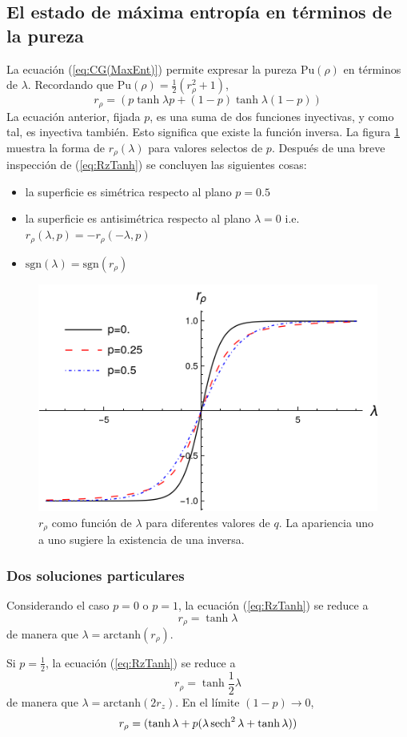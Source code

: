 \subsection{El estado de máxima entropía en términos de la pureza}

La ecuación (\ref{eq:CG(MaxEnt)}) permite expresar la pureza $\text{Pu}(\rho)$ en términos de $\lambda$. Recordando que $\text{Pu}(\rho)=\frac{1}{2}(r_{\rho}^{2}+1)$,
\begin{equation}\label{eq:RzTanh}
    \boxed{r_{\rho}=(p\tanh{\lambda p}+(1-p)\tanh{\lambda (1-p)})}  
\end{equation}
La ecuación anterior, fijada $p$, es una suma de dos funciones inyectivas, y como tal, es inyectiva también. Esto significa que existe la función inversa. La figura \ref{fig:rzinv} muestra la forma de $r_{\rho}(\lambda)$ para valores selectos de $p$. Después de una breve inspección de (\ref{eq:RzTanh}) se concluyen las siguientes cosas:
\begin{itemize}
\item la superficie es simétrica respecto al plano $p=0.5$
\item la superficie es antisimétrica  respecto al plano $\lambda=0$ i.e. $r_{\rho}(\lambda,p)=-r_{\rho}(-\lambda,p)$
\item $\text{sgn}(\lambda)=\text{sgn}(r_{\rho})$
\end{itemize}
\begin{figure}[h!]
\centering
\includegraphics[width=0.6\linewidth]{maxent/figures/rz(lambda)_lambda-8to8.png}
\caption{$r_{\rho}$ como función de $\lambda$ para diferentes valores de $q$. La apariencia uno a uno sugiere la existencia de una inversa.}
\label{fig:rzinv}
\end{figure}

\subsubsection{Dos soluciones particulares}

Considerando el caso $p=0$ o $p=1$, la ecuación (\ref{eq:RzTanh}) se reduce a 
\begin{equation}
r_{\rho}=\tanh{\lambda}
\end{equation}
de manera que $\lambda=\text{arctanh}(r_{\rho})$.

Si $p=\frac{1}{2}$, la ecuación (\ref{eq:RzTanh}) se reduce a
\begin{equation}
r_{\rho}=\tanh\frac{1}{2}\lambda
\end{equation}
de manera que $\lambda=\text{arctanh}(2r_{z})$.
En el límite $(1-p)\rightarrow 0$,
\begin{equation}
  r_{\rho}=(\tanh{\lambda}+p(\lambda\sech^{2}{\lambda}+\tanh{\lambda}))
\end{equation}
\newpage